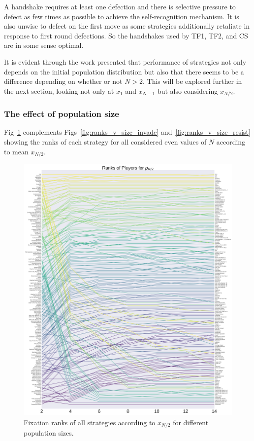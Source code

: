 \documentclass[10pt,letterpaper]{article}
\begin{document}
A handshake requires at least one defection and there is
selective pressure to defect as few times as possible to achieve the
self-recognition mechanism. It is also unwise to defect on the first move as
some strategies additionally retaliate in response to first round defections. So the
handshakes used by TF1, TF2, and CS are in some sense optimal.

It is evident through
the work presented that performance of strategies not only depends
on the initial population distribution but also that there seems to be a
difference depending on whether or not \(N>2\). This will be explored further in
the next section, looking not only at \(x_1\) and \(x_{N-1}\) but also
considering
\(x_{N/2}\).

\subsubsection*{The effect of population size}

Fig~\ref{fig:ranks_v_size_coexist} complements
Figs~\ref{fig:ranks_v_size_invade} and~\ref{fig:ranks_v_size_resist} showing the
ranks of each strategy for all considered even values of \(N\) according to mean
\(x_{N/2}\).

\begin{figure}[!hbtp]
    \centering
    \includegraphics[width=\columnwidth]{./average_rank_vs_population_size_coexist.pdf}
    \caption{Fixation ranks of all strategies according to \(x_{N/2}\) for different
    population sizes.}
    \label{fig:ranks_v_size_coexist}
\end{figure}
\end{document}
